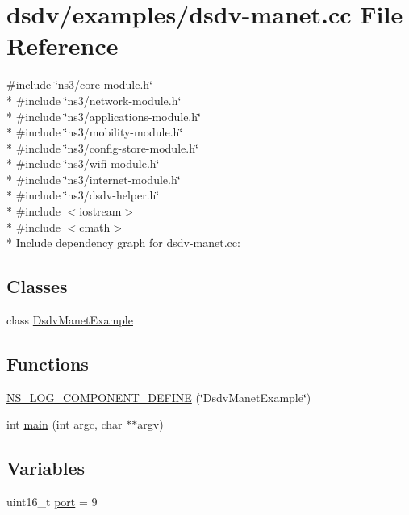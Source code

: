 \hypertarget{dsdv-manet_8cc}{}\section{dsdv/examples/dsdv-\/manet.cc File Reference}
\label{dsdv-manet_8cc}
{\ttfamily \#include \char`\"{}ns3/core-\/module.\+h\char`\"{}}\\*
{\ttfamily \#include \char`\"{}ns3/network-\/module.\+h\char`\"{}}\\*
{\ttfamily \#include \char`\"{}ns3/applications-\/module.\+h\char`\"{}}\\*
{\ttfamily \#include \char`\"{}ns3/mobility-\/module.\+h\char`\"{}}\\*
{\ttfamily \#include \char`\"{}ns3/config-\/store-\/module.\+h\char`\"{}}\\*
{\ttfamily \#include \char`\"{}ns3/wifi-\/module.\+h\char`\"{}}\\*
{\ttfamily \#include \char`\"{}ns3/internet-\/module.\+h\char`\"{}}\\*
{\ttfamily \#include \char`\"{}ns3/dsdv-\/helper.\+h\char`\"{}}\\*
{\ttfamily \#include $<$iostream$>$}\\*
{\ttfamily \#include $<$cmath$>$}\\*
Include dependency graph for dsdv-\/manet.cc\+:
\subsection*{Classes}
\begin{DoxyCompactItemize}
\item 
class \hyperlink{classDsdvManetExample}{Dsdv\+Manet\+Example}
\end{DoxyCompactItemize}
\subsection*{Functions}
\begin{DoxyCompactItemize}
\item 
\hyperlink{dsdv-manet_8cc_ab53bd119aad948fcec38869045a1c29b}{N\+S\+\_\+\+L\+O\+G\+\_\+\+C\+O\+M\+P\+O\+N\+E\+N\+T\+\_\+\+D\+E\+F\+I\+NE} (\char`\"{}Dsdv\+Manet\+Example\char`\"{})
\item 
int \hyperlink{dsdv-manet_8cc_a3c04138a5bfe5d72780bb7e82a18e627}{main} (int argc, char $\ast$$\ast$argv)
\end{DoxyCompactItemize}
\subsection*{Variables}
\begin{DoxyCompactItemize}
\item 
uint16\+\_\+t \hyperlink{dsdv-manet_8cc_a8e0798404bf2cf5dabb84c5ba9a4f236}{port} = 9
\end{DoxyCompactItemize}


